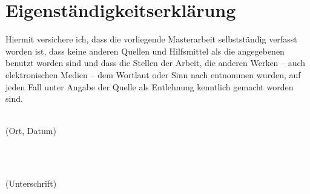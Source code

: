%
\chapter*{Eigenständigkeitserklärung}
\label{sec:declaration}

Hiermit versichere ich, dass die vorliegende Masterarbeit \textit{\thesisTitle} selbstständig verfasst worden ist, dass keine anderen Quellen und Hilfsmittel als die angegebenen benutzt worden sind und dass die Stellen der Arbeit, die anderen Werken -- auch elektronischen Medien -- dem Wortlaut oder Sinn nach entnommen wurden, auf jeden Fall unter Angabe der Quelle als Entlehnung kenntlich gemacht worden sind.

\vspace*{2cm}

\begin{minipage}{0.5\textwidth}
	\begin{flushleft} \large
		\underline{\hspace{6cm}} \\
		{\footnotesize (Ort, Datum)}
	\end{flushleft}
\end{minipage}
~
\begin{minipage}{0.5\textwidth}
	\begin{flushright} \large
		\underline{\hspace{6cm}} \\
		{\footnotesize (Unterschrift)}
	\end{flushright}
\end{minipage}\\[0.5cm]

